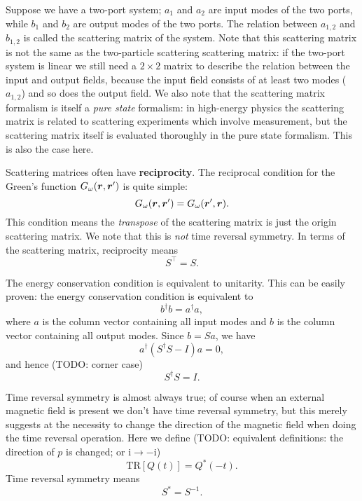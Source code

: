 \documentclass[hyperref, a4paper]{article}
\newcommand*{\ii}{\mathrm{i}}
\newcommand*{\concept}[1]{{\textbf{#1}}}
\begin{document}
Suppose we have a two-port system; 
$a_1$ and $a_2$ are input modes of the two ports, 
while $b_1$ and $b_2$ are output modes of the two ports.
The relation between $a_{1,2}$ and $b_{1,2}$ is called the scattering matrix of the system.
Note that this scattering matrix is not the same as 
the two-particle scattering scattering matrix:
if the two-port system is linear we still need a $2\times 2$ matrix 
to describe the relation between the input and output fields, 
because the input field consists of at least two modes ($a_{1, 2}$)
and so does the output field.
We also note that the scattering matrix formalism 
is itself a \emph{pure state} formalism:
in high-energy physics the scattering matrix is related to scattering experiments 
which involve measurement, 
but the scattering matrix itself is evaluated thoroughly in the pure state formalism.
This is also the case here.

Scattering matrices often have \concept{reciprocity}.
The reciprocal condition for the Green's function ${G}_\omega(\vb*{r}, \vb*{r}')$ is quite simple:
\begin{equation}
    G_\omega (\vb*{r}, \vb*{r}') = G_\omega (\vb*{r}', \vb*{r}).
\end{equation}
This condition means the \emph{transpose} of the scattering matrix is just the origin scattering matrix.
We note that this is \emph{not} time reversal symmetry.
In terms of the scattering matrix, reciprocity means 
\begin{equation}
    S^\top = S.
\end{equation}

The energy conservation condition is equivalent to unitarity.
This can be easily proven: the energy conservation condition is equivalent to  
\begin{equation}
    b^\dagger b = a^\dagger a,
\end{equation}
where $a$ is the column vector containing all input modes 
and $b$ is the column vector containing all output modes.
Since $b = S a$, we have 
\begin{equation}
    a^\dagger (S^\dagger S - I) a = 0,
\end{equation}
and hence (TODO: corner case)
\begin{equation}
    S^\dagger S = I.
\end{equation}

Time reversal symmetry is almost always true; 
of course when an external magnetic field is present 
we don't have time reversal symmetry, 
but this merely suggests at the necessity to change the direction of the magnetic field 
when doing the time reversal operation.
Here we define (TODO: equivalent definitions: the direction of $p$ is changed; or $\ii \to - \ii$)
\begin{equation}
    \mathrm{TR}[Q(t)] = Q^*(-t).
\end{equation}
Time reversal symmetry means 
\begin{equation}
    S^* = S^{-1}.
\end{equation}
\end{document}
